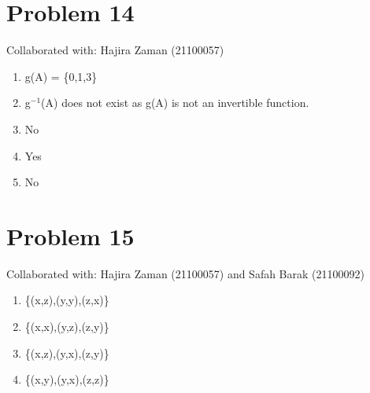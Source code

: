 \documentclass{article}
\begin{document}
\section{Problem 14}
Collaborated with: Hajira Zaman (21100057)
\begin{enumerate}
\item %
g(A) = \{0,1,3\}

\item %
g$^{-1}$(A) does not exist as g(A) is not an invertible function.

\item %
No

\item %
Yes 
\item %
No
\end{enumerate}


\section{Problem 15}
Collaborated with: Hajira Zaman (21100057) and Safah Barak (21100092) \\
\begin{enumerate}
\item %
\{(x,z),(y,y),(z,x)\}

\item %
\{(x,x),(y,z),(z,y)\}

\item %
\{(x,z),(y,x),(z,y)\}

\item %
\{(x,y),(y,x),(z,z)\}
\end{enumerate}
\end{document}
